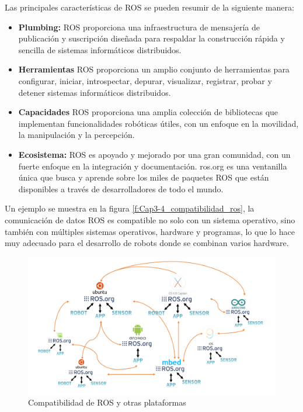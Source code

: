         Las principales características de ROS se pueden resumir de la siguiente manera:
        
        \begin{itemize}
            \item \textbf{Plumbing:} ROS proporciona una infraestructura de mensajería de publicación y suscripción diseñada para respaldar la construcción rápida y sencilla de sistemas informáticos distribuidos.
            \item \textbf{Herramientas} ROS proporciona un amplio conjunto de herramientas para configurar, iniciar, introspectar, depurar, visualizar, registrar, probar y detener sistemas informáticos distribuidos.
            \item \textbf{Capacidades} ROS proporciona una amplia colección de bibliotecas que implementan funcionalidades robóticas útiles, con un enfoque en la movilidad, la manipulación y la percepción.
            \item \textbf{Ecosistema:} ROS es apoyado y mejorado por una gran comunidad, con un fuerte enfoque en la integración y documentación. ros.org es una ventanilla única que busca y aprende sobre los miles de paquetes ROS que están disponibles a través de desarrolladores de todo el mundo.
        \end{itemize}

        Un ejemplo se muestra en la figura \eqref{f:Cap3-4_compatibilidad_ros}, la comunicación de datos ROS es compatible no solo con un sistema operativo, sino también con múltiples sistemas operativos, hardware y programas, lo que lo hace muy adecuado para el desarrollo de robots donde se combinan varios hardware. 
        
        \begin{figure}[htb]
            \centering
            \includegraphics[width=1.0\linewidth]{Main/Chapter3/Images3/3-4/compatibilidad-ros.png}
            \caption{Compatibilidad de ROS y otras plataformas \cite{ROS_BOOK_1}}
            \label{f:Cap3-4_compatibilidad_ros}
        \end{figure}
        

